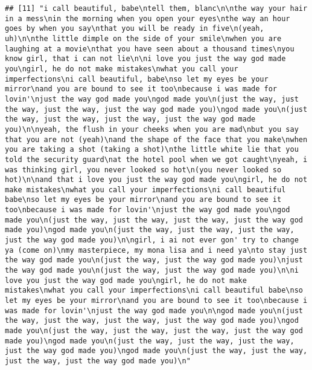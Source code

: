 \documentclass[]{article}
\begin{document}
\begin{verbatim}
## [11] "i call beautiful, babe\ntell them, blanc\n\nthe way your hair in a mess\nin the morning when you open your eyes\nthe way an hour goes by when you say\nthat you will be ready in five\n(yeah, uh)\n\nthe little dimple on the side of your smile\nwhen you are laughing at a movie\nthat you have seen about a thousand times\nyou know girl, that i can not lie\n\ni love you just the way god made you\ngirl, he do not make mistakes\nwhat you call your imperfections\ni call beautiful, babe\nso let my eyes be your mirror\nand you are bound to see it too\nbecause i was made for lovin'\njust the way god made you\ngod made you\n(just the way, just the way, just the way, just the way god made you)\ngod made you\n(just the way, just the way, just the way, just the way god made you)\n\nyeah, the flush in your cheeks when you are mad\nbut you say that you are not (yeah)\nand the shape of the face that you make\nwhen you are taking a shot (taking a shot)\nthe little white lie that you told the security guard\nat the hotel pool when we got caught\nyeah, i was thinking girl, you never looked so hot\n(you never looked so hot)\n\nand that i love you just the way god made you\ngirl, he do not make mistakes\nwhat you call your imperfections\ni call beautiful babe\nso let my eyes be your mirror\nand you are bound to see it too\nbecause i was made for lovin'\njust the way god made you\ngod made you\n(just the way, just the way, just the way, just the way god made you)\ngod made you\n(just the way, just the way, just the way, just the way god made you)\n\ngirl, i ai not ever gon' try to change ya (come on)\nmy masterpiece, my mona lisa and i need ya\nto stay just the way god made you\n(just the way, just the way god made you)\njust the way god made you\n(just the way, just the way god made you)\n\ni love you just the way god made you\ngirl, he do not make mistakes\nwhat you call your imperfections\ni call beautiful babe\nso let my eyes be your mirror\nand you are bound to see it too\nbecause i was made for lovin'\njust the way god made you\n\ngod made you\n(just the way, just the way, just the way, just the way god made you)\ngod made you\n(just the way, just the way, just the way, just the way god made you)\ngod made you\n(just the way, just the way, just the way, just the way god made you)\ngod made you\n(just the way, just the way, just the way, just the way god made you)\n"                                                                                                                                                                                                                                                                                                                                                                                                                                                                                             

\end{verbatim}
\end{document}
